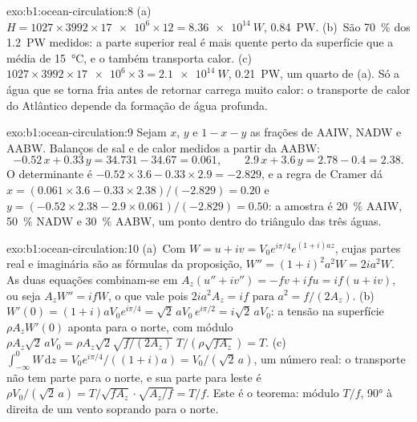 \begin{solution}{exo:b1:ocean-circulation:8}
(a)~$H = 1027 \times 3992 \times \num{17e6} \times 12 = \qty{8.36e14}{W}$,
\qty{0.84}{PW}. (b)~São \qty{70}{\percent} dos \qty{1.2}{PW} medidos: a parte superior real
é mais quente perto da superfície que a média de \qty{15}{\celsius}, e o
 também transporta calor. (c)~$1027 \times 3992 \times \num{17e6} \times 3 =
\qty{2.1e14}{W}$, \qty{0.21}{PW}, um quarto de (a). Só a água que se torna fria
antes de retornar carrega muito calor: o transporte de calor do Atlântico depende da
formação de água profunda.
\end{solution}

\begin{solution}{exo:b1:ocean-circulation:9}
Sejam $x$, $y$ e $1 - x - y$ as frações de AAIW, NADW e AABW. Balanços de sal e de calor
medidos a partir da AABW:
\[
  -0.52\,x + 0.33\,y = 34.731 - 34.67 = 0.061,\qquad
  2.9\,x + 3.6\,y = 2.78 - 0.4 = 2.38 .
\]
O determinante é $-0.52 \times 3.6 - 0.33 \times 2.9 = -2.829$, e a regra de Cramer
dá $x = (0.061 \times 3.6 - 0.33 \times 2.38)/(-2.829) = 0.20$ e $y = (-0.52
\times 2.38 - 2.9 \times 0.061)/(-2.829) = 0.50$: a amostra é \qty{20}{\percent}
AAIW, \qty{50}{\percent} NADW e \qty{30}{\percent} AABW, um ponto dentro do
triângulo das três águas.
\end{solution}

\begin{solution}{exo:b1:ocean-circulation:10}
(a)~Com $W = u + iv = V_0e^{i\pi/4}e^{(1+i)az}$, cujas partes real e imaginária são
as fórmulas da proposição, $W'' = (1+i)^2a^2W = 2ia^2W$. As duas equações
combinam-se em $A_z(u'' + iv'') = -fv + ifu = if(u + iv)$, ou seja $A_zW'' = ifW$,
o que vale pois $2ia^2A_z = if$ para $a^2 = f/(2A_z)$. (b)~$W'(0) =
(1+i)aV_0e^{i\pi/4} = \sqrt2\,aV_0\,e^{i\pi/2} = i\sqrt2\,aV_0$: a tensão na superfície
$\rho A_zW'(0)$ aponta para o norte, com módulo $\rho A_z\sqrt2\,aV_0 = \rho A_z\sqrt2
\sqrt{f/(2A_z)}\;T/(\rho\sqrt{fA_z}) = T$. (c)~$\int_{-\infty}^0 W\,\mathrm dz =
V_0e^{i\pi/4}/((1+i)a) = V_0/(\sqrt2\,a)$, um número real: o transporte não tem
parte para o norte, e sua parte para leste é $\rho V_0/(\sqrt2\,a) =
T/\sqrt{fA_z}\cdot\sqrt{A_z/f} = T/f$. Este é o teorema: módulo $T/f$, \ang{90} à
direita de um vento soprando para o norte.
\end{solution}

